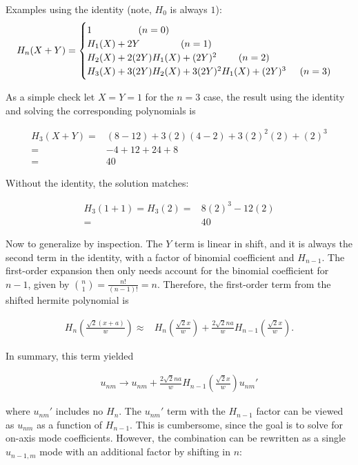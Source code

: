 \documentclass[aps,twoside,secnumarabic,balancelastpage,amsmath,amssymb,nofootinbib,hyperref=pdftex]{revtex4}
\newcommand\tab[1][3mm]{\hspace*{#1}}
\begin{document}
Examples using the identity (note, $H_0$ is always $1$):\\

\[
  H_{n}(X+Y)=\begin{cases}
               1 \tab\tab\tab\tab\tab\;\;(n=0)\\
               H_1(X) + 2Y \tab\tab\tab\tab\;\;\;(n=1)\\
               H_2(X) + 2(2Y)H_1(X) + (2Y)^2 \tab\tab\;\;(n=2)\\
               H_3(X) + 3(2Y)H_2(X) +3(2Y)^2H_1(X)+(2Y)^3\tab\;\;(n=3)
            \end{cases}
\]

As a simple check let $X = Y = 1$ for the $n=3$ case, the result using the identity and solving the corresponding polynomials is

\begin{align*}
	H_3 (X+Y) =&
	(8-12)
	+ 3(2)(4-2)
	+ 3(2)^2(2)
	+ (2)^3
	\\=&
	-4 + 12 + 24 + 8
	\\=&
	40
\end{align*}

Without the identity, the solution matches:

\begin{align*}
	H_3 (1+1) = H_3(2) =&
	8(2)^3 - 12(2)
	\\=& 40
\end{align*}

Now to generalize by inspection. The $Y$ term is linear in shift, and it is always the second term in the identity, with a factor of binomial coefficient and $H_{n-1}$. The first-order expansion then only needs account for the binomial coefficient for $n-1$, given by ${n\choose 1} = \frac{n!}{(n-1)!}=n$. Therefore, the first-order term from the shifted hermite polynomial is 

\begin{align*}
	H_n(\frac{\sqrt{2}(x+a)}{w}) \approx&
	 H_n(\frac{\sqrt{2}x}{w})+ 
	 	 \frac{2\sqrt{2}n a}{w}
	 	 H_{n-1}(\frac{\sqrt{2}x}{w}).
\end{align*}

In summary, this term yielded

\begin{align*}
u_{nm} \rightarrow u_{nm} + \frac{2\sqrt{2}n a}{w}
	 	 H_{n-1}(\frac{\sqrt{2}x}{w}) u_{nm}' 
\end{align*}

where $u_{nm}'$ includes no $H_n$. The $u_{nm}'$ term with the $H_{n-1}$ factor can be viewed as $u_{nm}$ as a function of $H_{n-1}$. This is cumbersome, since the goal is to solve for on-axis mode coefficients. However, the combination can be rewritten as a single $u_{n-1,m}$ mode with an additional factor by shifting in $n$:
\end{document}
